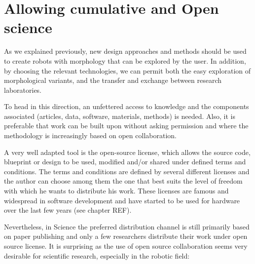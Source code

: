 \section{Allowing cumulative and Open science} %
\label{sec:allow-cumulative-science}
As we explained previously, new design approaches and methods should be used to create robots with morphology that can be explored by the user. In addition, by choosing the relevant technologies, we can permit both  the easy exploration of morphological variants, and the transfer and exchange between research laboratories.

To head in this direction, an unfettered access to knowledge and the components associated (articles, data, software, materials, methods) is needed. Also, it is preferable that work can be built upon without asking permission and where the methodology is increasingly based on open collaboration.

A very well adapted tool is the open-source license, which allows the source code, blueprint or design to be used, modified and/or shared under defined terms and conditions. The terms and conditions are defined by several different licenses and the author can choose among them the one that best suits the level of freedom  with which he wants to distribute his work. These licenses are famous and widespread in software development and have started to be used for hardware over the last few years (see chapter REF).

Nevertheless, in Science the preferred distribution channel is still primarily based on paper publishing and only a few researchers distribute their work under open source license. It is surprising as the use of open source collaboration seems very desirable for scientific research, especially in the robotic field:

